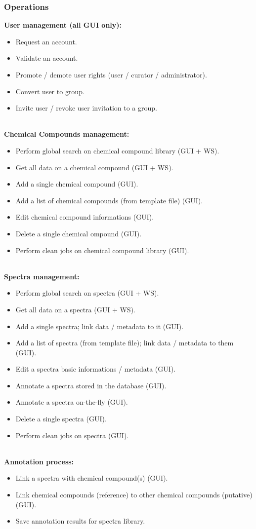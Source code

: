 \subsubsection{Operations}

\textbf{User management (all GUI only):}
\begin{itemize}
	\item Request an account.
	\item Validate an account.
	\item Promote / demote user rights (user / curator / administrator).
	\item Convert user to group.
	\item Invite user / revoke user invitation to a group.
\end{itemize}
~\\
\textbf{Chemical Compounds management:}
\begin{itemize}
	\item Perform global search on chemical compound library (GUI + WS).
	\item Get all data on a chemical compound (GUI + WS).
	\item Add a single chemical compound (GUI).
	\item Add a list of chemical compounds (from template file) (GUI).
	\item Edit chemical compound informations (GUI).
	\item Delete a single chemical ompound (GUI).
	\item Perform clean jobs on chemical compound library (GUI).
\end{itemize}
~\\
\textbf{Spectra management:}
\begin{itemize}
	\item Perform global search on spectra (GUI + WS).
	\item Get all data on a spectra (GUI + WS).
	\item Add a single spectra; link data / metadata to it (GUI).
	\item Add a list of spectra (from template file); link data / metadata to them (GUI).
	\item Edit a spectra basic informations / metadata (GUI).
	\item Annotate a spectra stored in the database (GUI).
	\item Annotate a spectra on-the-fly (GUI).
	\item Delete a single spectra (GUI).
	\item Perform clean jobs on spectra (GUI).
\end{itemize}
~\\
\textbf{Annotation process:}
\begin{itemize}
	\item Link a spectra with chemical compound(s) (GUI).
	\item Link chemical compounds (reference) to other chemical compounds (putative) (GUI).
	\item Save annotation results for spectra library.
\end{itemize}

